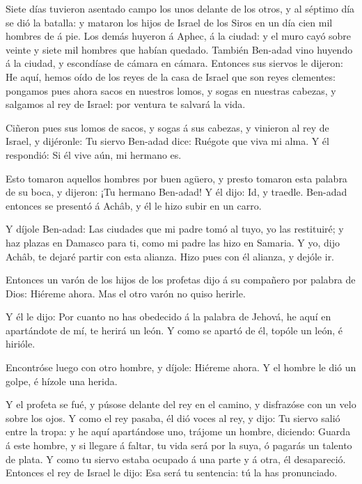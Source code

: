  Siete días tuvieron asentado campo los unos delante de los
otros, y al séptimo día se dió la batalla: y mataron los hijos de Israel
de los Siros en un día cien mil hombres de á pie.  Los
demás huyeron á Aphec, á la ciudad: y el muro cayó sobre veinte y siete
mil hombres que habían quedado. También Ben-adad vino huyendo á la
ciudad, y escondíase de cámara en cámara.  Entonces sus
siervos le dijeron: He aquí, hemos oído de los reyes de la casa de
Israel que son reyes clementes: pongamos pues ahora sacos en nuestros
lomos, y sogas en nuestras cabezas, y salgamos al rey de Israel: por
ventura te salvará la vida.

 Ciñeron pues sus lomos de sacos, y sogas á sus cabezas, y
vinieron al rey de Israel, y dijéronle: Tu siervo Ben-adad dice: Ruégote
que viva mi alma. Y él respondió: Si él vive aún, mi hermano es.

 Esto tomaron aquellos hombres por buen agüero, y presto
tomaron esta palabra de su boca, y dijeron: ¡Tu hermano Ben-adad! Y él
dijo: Id, y traedle. Ben-adad entonces se presentó á Achâb, y él le hizo
subir en un carro.

 Y díjole Ben-adad: Las ciudades que mi padre tomó al tuyo,
yo las restituiré; y haz plazas en Damasco para ti, como mi padre las
hizo en Samaria. Y yo, dijo Achâb, te dejaré partir con esta alianza.
Hizo pues con él alianza, y dejóle ir.

 Entonces un varón de los hijos de los profetas dijo á su
compañero por palabra de Dios: Hiéreme ahora. Mas el otro varón no quiso
herirle.

 Y él le dijo: Por cuanto no has obedecido á la palabra de
Jehová, he aquí en apartándote de mí, te herirá un león. Y como se
apartó de él, topóle un león, é hirióle.

 Encontróse luego con otro hombre, y díjole: Hiéreme ahora.
Y el hombre le dió un golpe, é hízole una herida.

 Y el profeta se fué, y púsose delante del rey en el
camino, y disfrazóse con un velo sobre los ojos.  Y como el
rey pasaba, él dió voces al rey, y dijo: Tu siervo salió entre la tropa:
y he aquí apartándose uno, trájome un hombre, diciendo: Guarda á este
hombre, y si llegare á faltar, tu vida será por la suya, ó pagarás un
talento de plata.  Y como tu siervo estaba ocupado á una
parte y á otra, él desapareció. Entonces el rey de Israel le dijo: Esa
será tu sentencia: tú la has pronunciado.

